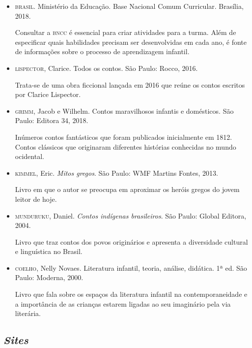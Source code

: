 \documentclass[11pt]{extarticle}
\begin{document}
\begin{itemize}
\item \textsc{brasil}. Ministério da Educação. Base Nacional Comum Curricular. Brasília, 2018.

Consultar a \textsc{bncc} é essencial para criar atividades para a turma. Além de especificar quais habilidades precisam ser desenvolvidas em cada ano, é fonte de informações sobre o processo de aprendizagem infantil. 

\item \textsc{lispector}, Clarice. Todos os contos. São Paulo: Rocco, 2016.

Trata-se de uma obra ficcional lançada em 2016 que reúne os contos escritos por Clarice Lispector. 
 
\item \textsc{grimm}, Jacob e Wilhelm. Contos maravilhosos infantis e domésticos. São Paulo: Editora 34, 2018.

Inúmeros contos fantásticos que foram publicados inicialmente em 1812. Contos clássicos que originaram diferentes histórias conhecidas no mundo ocidental.

\item \textsc{kimmel}, Eric. \textit{Mitos gregos}. São Paulo: WMF Martins Fontes, 2013.

Livro em que o autor se preocupa em aproximar os heróis gregos do jovem leitor de hoje.

\item \textsc{munduruku}, Daniel. \textit{Contos indígenas brasileiros}. São Paulo: Global Editora, 2004.

Livro que traz contos dos povos originários e apresenta a diversidade cultural e linguística no Brasil.

\item \textsc{coelho}, Nelly Novaes. Literatura infantil, teoria, análise, didática. 1ª ed. São Paulo: Moderna, 2000.

Livro que fala sobre os espaços da literatura infantil na contemporaneidade e a importância de as crianças estarem ligadas ao seu imaginário pela via literária.

\end{itemize}

\subsection{\textit{Sites}}
\end{document}
